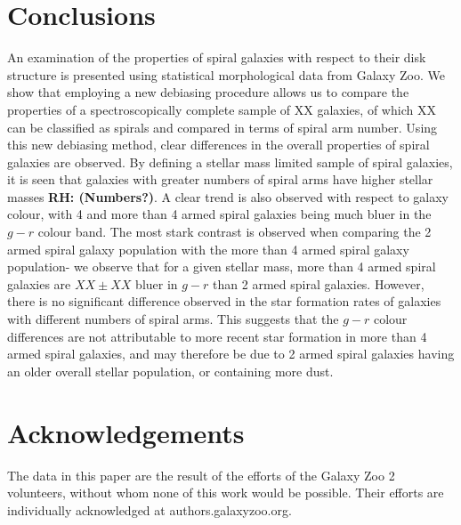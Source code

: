 \documentclass[useAMS,usenatbib]{mn2e}
\newcommand{\rh}[1]{{\bf \textcolor{RoyalPurple}{RH: #1}}}
\begin{document}
\section{Conclusions}
\label{sec:conclusions}

An examination of the properties of spiral galaxies with respect to their disk structure is presented using statistical morphological data from Galaxy Zoo. We show that employing a new debiasing procedure allows us to compare the properties of a spectroscopically complete sample of XX galaxies, of which XX can be classified as spirals and compared in terms of spiral arm number. Using this new debiasing method, clear differences in the overall properties of spiral galaxies are observed. By defining a stellar mass limited sample of spiral galaxies, it is seen that galaxies with greater numbers of spiral arms have higher stellar masses \rh{(Numbers?)}. A clear trend is also observed with respect to galaxy colour, with 4 and more than 4 armed spiral galaxies being much bluer in the $g-r$ colour band. The most stark contrast is observed when comparing the 2 armed spiral galaxy population with the more than 4 armed spiral galaxy population- we observe that for a given stellar mass, more than 4 armed spiral galaxies are $XX \pm XX$ bluer in $g-r$ than 2 armed spiral galaxies. However, there is no significant difference observed in the star formation rates of galaxies with different numbers of spiral arms. This suggests  that the $g-r$ colour differences are not attributable to more recent star formation in more than 4 armed spiral galaxies, and may therefore be due to 2 armed spiral galaxies having an older overall stellar population, or containing more dust.


\section{Acknowledgements}

The data in this paper are the result of the efforts of the Galaxy Zoo 2 volunteers, without whom none of this work would be possible. Their efforts are individually acknowledged at authors.galaxyzoo.org.



\end{document}
